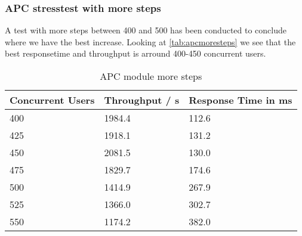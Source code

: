 \subsubsection{APC stresstest with more steps}
A test with more steps between 400 and 500 has been conducted to conclude where we have the best increase.
Looking at \autoref{tab:apcmoresteps} we see that the best responsetime and throughput is arround 400-450 concurrent users.
\begin{table}[htb!]\begin{center}
\caption{APC module more steps}\label{tab:apcmoresteps}
\begin{tabular}{|p{2.2cm}|p{2.2cm}|p{2.2cm}|}\hline\rowcolor{myLightGreen}
 {\bf\color{white} Concurrent Users} & {\bf\color{white} Throughput / s} & {\bf\color{white} Response Time in ms} \\ \hline 
 400 & 1984.4 & 112.6 \\ \hline 
 425 & 1918.1 & 131.2 \\ \hline 
 450 & 2081.5 & 130.0 \\ \hline 
 475 & 1829.7 & 174.6 \\ \hline 
 500 & 1414.9 & 267.9 \\ \hline 
 525 & 1366.0 & 302.7 \\ \hline 
 550 & 1174.2 & 382.0 \\ \hline 
\end{tabular}\end{center}
\end{table}
